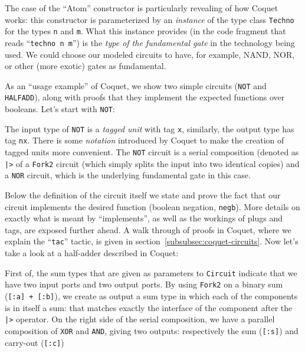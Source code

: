             The case of the ``Atom'' constructor is particularly revealing of how Coquet works: this
            constructor is parameterized by an \emph{instance} of the type class \texttt{Techno} for
            the types \texttt{n} and \texttt{m}. What this instance provides (in the code fragment
            that reads ``\texttt{techno n m}'') is the \emph{type of the fundamental gate} in the
            technology being used. We could choose our modeled circuits to have, for example, NAND,
            NOR, or other (more exotic) gates as fundamental.

            As an ``usage example'' of Coquet, we show two simple circuits (\texttt{NOT} and
            \texttt{HALFADD}), along with proofs that they implement the expected functions over
            booleans. Let's start with \texttt{NOT}:


            The input type of \texttt{NOT} is a \emph{tagged unit} with tag \texttt{x}, similarly,
            the output type has tag \texttt{nx}. There is some \emph{notation} introduced by Coquet
            to make the creation of tagged units more convenient. The \texttt{NOT} circuit is a
            serial composition (denoted as \texttt{|>} of a \texttt{Fork2} circuit (which simply
            splits the input into two identical copies) and a \texttt{NOR} circuit, which is the
            underlying fundamental gate in this case.

            Below the definition of the circuit itself we state and prove the fact that our circuit
            implements the desired function (boolean negation, \texttt{negb}). More details on
            exactly what is meant by ``implements'', as well as the workings of plugs and tags, are
            exposed further ahead. A walk through of proofs in Coquet, where we explain the
            ``\texttt{tac}'' tactic, is given in section~\ref{subsubsec:coquet-circuits}. Now let's
            take a look at a half-adder described in Coquet:


            First of, the sum types that are given as parameters to \texttt{Circuit} indicate that
            we have two input ports and two output ports. By using \texttt{Fork2} on a binary sum
            (\texttt{[:a] + [:b]}), we create as output a sum type in which each of the components
            is in itself a sum: that matches exactly the interface of the component after the
            \texttt{|>} operator. On the right side of the serial composition, we have a parallel
            composition of \texttt{XOR} and \texttt{AND}, giving two outputs: respectively the sum
            (\texttt{[:s]}) and carry-out (\texttt{[:c]}) 

